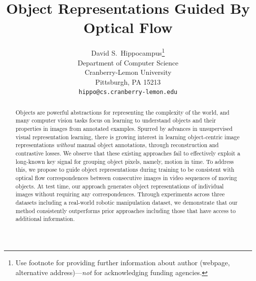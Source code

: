 \documentclass{article}
\title{Object Representations Guided By Optical Flow}
\author{%
  David S.~Hippocampus\thanks{Use footnote for providing further information
    about author (webpage, alternative address)---\emph{not} for acknowledging
    funding agencies.} \\
  Department of Computer Science\\
  Cranberry-Lemon University\\
  Pittsburgh, PA 15213 \\
  \texttt{hippo@cs.cranberry-lemon.edu} \\
}
\newcommand{\jd}[1]{\textcolor{orange}{[DJ: #1]}}
\begin{document}
\maketitle

  
  

\begin{abstract}
  Objects are powerful abstractions for representing the complexity of the world, and many computer vision tasks focus on learning to understand objects and their properties in images from annotated examples. Spurred by advances in unsupervised visual representation learning,  there is growing interest in learning object-centric image representations \emph{without} manual object annotations, through reconstruction and contrastive losses. We observe that these existing approaches fail to effectively exploit a long-known key signal for grouping object pixels, namely, motion in time. To address this, we propose to guide object representations during training to be consistent with optical flow correspondences between consecutive images in video sequences of moving objects. At test time, our approach generates object representations of individual images without requiring any correspondences. Through experiments across three datasets including a real-world robotic manipulation dataset, we demonstrate that our method consistently outperforms prior approaches including those that have access to additional information. %
 \end{abstract}
\end{document}
